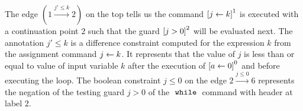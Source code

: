The edge $(1 \xrightarrow{j' \leq k} 2)$ on the top tells us the command 
$\clabel{\assign{j}{k}}^1$ is executed with a continuation point $2$ such that the
guard $\clabel{j > 0}^2$ will be evaluated next.
The annotation $j' \leq k$ is a difference constraint 
computed for
the expression $k$ from the assignment command $\mathrel{ j \leftarrow k }$.
It represents that the value of $j$ is less than or equal to value of input variable $k$ after the
execution of $\clabel{\assign{a}{0}}^0$ and before executing the loop.
The boolean constraint $j \leq 0 $ on the edge $2 \xrightarrow{j \leq 0} 6$
represents the negation of the testing guard $j > 0$
of the $\;\mathtt{while}\;$ command with header at label $2$.

